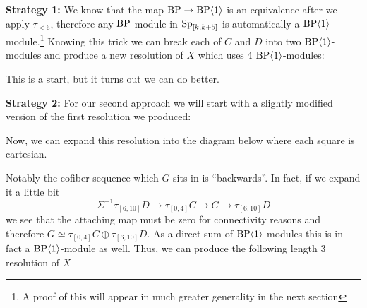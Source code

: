 {\bf Strategy 1:}
We know that the map $\textup{BP} \to \textup{BP}\langle 1 \rangle$ is an equivalence after we apply $\tau_{<6}$, therefore any $\textup{BP}$ module in $\operatorname{\mathrm{Sp}}_{[k,k+5]}$ is automatically a $\textup{BP}\langle 1 \rangle$ module.\footnote{A proof of this will appear in much greater generality in the next section} Knowing this trick we can break each of $C$ and $D$ into two $\textup{BP}\langle 1 \rangle$-modules and produce a new resolution of $X$ which uses 4 $\textup{BP}\langle 1 \rangle$-modules:
\begin{center}
\end{center}

This is a start, but it turns out we can do better.

{\bf Strategy 2:}
For our second approach we will start with a slightly modified version of the first resolution we produced:
\begin{center}
\end{center}
Now, we can expand this resolution into the diagram below where each square is cartesian.
\begin{center}
\end{center}

Notably the cofiber sequence which $G$ sits in is ``backwards''.
In fact, if we expand it a little bit
$$ \Sigma^{-1}\tau_{[6,10]}D \to \tau_{[0,4]}C \to G \to \tau_{[6,10]}D $$
we see that the attaching map must be zero for connectivity reasons and therefore $G \simeq \tau_{[0,4]}C \oplus \tau_{[6,10]}D$.
As a direct sum of $\textup{BP}\langle 1 \rangle$-modules this is in fact a $\textup{BP}\langle 1 \rangle $-module as well. Thus, we can produce the following length $3$ resolution of $X$
\begin{center}
\end{center}


